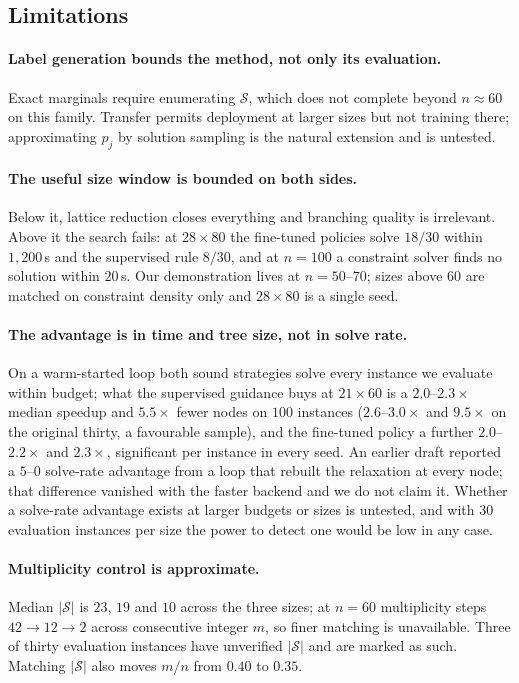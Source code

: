 \documentclass[final,5p,times,twocolumn]{elsarticle}
\newcommand{\SOL}{\mathcal{S}}
\begin{document}
\subsection{Limitations}
\label{sec:exp-limits}

\paragraph{Label generation bounds the method, not only its evaluation.} Exact marginals require enumerating $\SOL$, which does not complete beyond $n\approx60$ on this family. Transfer permits deployment at larger sizes but not training there; approximating $p_j$ by solution sampling is the natural extension and is untested.

\paragraph{The useful size window is bounded on both sides.} Below it, lattice reduction closes everything and branching quality is irrelevant. Above it the search fails: at $28\times80$ the fine-tuned policies solve $18/30$ within $1{,}200$\,s and the supervised rule $8/30$, and at $n=100$ a constraint solver finds no solution within $20$\,s. Our demonstration lives at $n=50$--$70$; sizes above $60$ are matched on constraint density only and $28\times80$ is a single seed.

\paragraph{The advantage is in time and tree size, not in solve rate.} On a warm-started loop both sound strategies solve every instance we evaluate within budget; what the supervised guidance buys at $21\times60$ is a $2.0$--$2.3\times$ median speedup and $5.5\times$ fewer nodes on $100$ instances ($2.6$--$3.0\times$ and $9.5\times$ on the original thirty, a favourable sample), and the fine-tuned policy a further $2.0$--$2.2\times$ and $2.3\times$, significant per instance in every seed. An earlier draft reported a $5$--$0$ solve-rate advantage from a loop that rebuilt the relaxation at every node; that difference vanished with the faster backend and we do not claim it. Whether a solve-rate advantage exists at larger budgets or sizes is untested, and with $30$ evaluation instances per size the power to detect one would be low in any case.

\paragraph{Multiplicity control is approximate.} Median $|\SOL|$ is $23$, $19$ and $10$ across the three sizes; at $n=60$ multiplicity steps $42\to12\to2$ across consecutive integer $m$, so finer matching is unavailable. Three of thirty evaluation instances have unverified $|\SOL|$ and are marked as such. Matching $|\SOL|$ also moves $m/n$ from $0.40$ to $0.35$.
\end{document}
